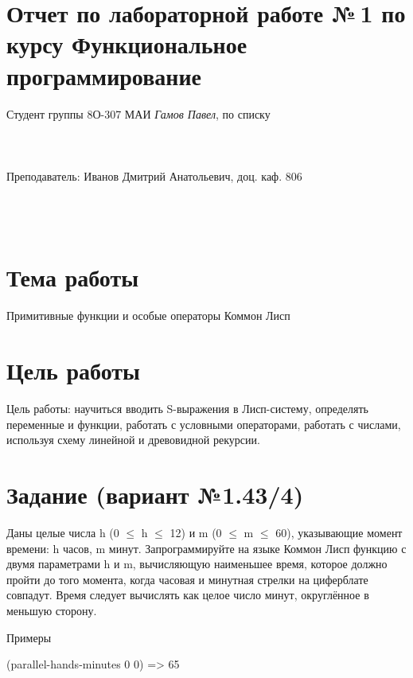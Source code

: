 \documentclass[15pt]{extarticle}
\begin{document}
\section*{Отчет по лабораторной работе №\,1
по курсу \guillemotleft  Функциональное программирование\guillemotright}

\begin{flushright}
Студент группы 8О-307 МАИ \textit{Гамов Павел},  по списку \\
 \\
 \\
\ \\
Преподаватель: Иванов Дмитрий Анатольевич, доц. каф. 806 \\
 \\
 \\
 \\

\end{flushright}

\section{Тема работы}
Примитивные функции и особые операторы Коммон Лисп

\section{Цель работы}
Цель работы: научиться вводить S-выражения в Лисп-систему, определять переменные и функции, работать с условными операторами, работать с числами, используя схему линейной и древовидной рекурсии.

\section{Задание (вариант №1.43/4)}
Даны целые числа h (0 $\leq$ h $\le$ 12) и m (0 $\leq$ m $\le$ 60), указывающие момент времени: h часов, m минут.
Запрограммируйте на языке Коммон Лисп функцию с двумя параметрами h и m, вычисляющую наименьшее время, которое должно пройти до того момента, когда часовая и минутная стрелки на циферблате совпадут. Время следует вычислять как целое число минут, округлённое в меньшую сторону.

Примеры

(parallel-hands-minutes 0 0) => 65
\end{document}
